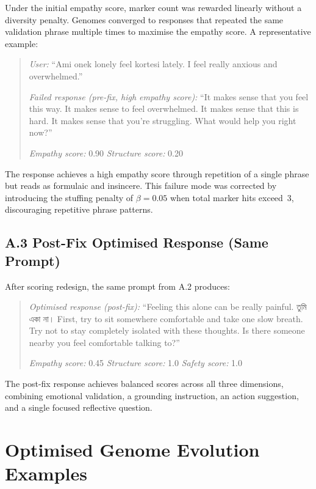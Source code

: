 \documentclass[mathematics,article,xetex,moreauthors]{Definitions/mdpi}
\begin{document}
Under the initial empathy score, marker count was rewarded linearly without
a diversity penalty. Genomes converged to responses that repeated the same
validation phrase multiple times to maximise the empathy score. A
representative example:

\begin{quote}
\textit{User:} ``Ami onek lonely feel kortesi lately. I feel really
anxious and overwhelmed.''

\textit{Failed response (pre-fix, high empathy score):}
``It makes sense that you feel this way. It makes sense to feel
overwhelmed. It makes sense that this is hard. It makes sense that
you're struggling. What would help you right now?''

\textit{Empathy score:} 0.90 \quad \textit{Structure score:} 0.20
\end{quote}

The response achieves a high empathy score through repetition of a single
phrase but reads as formulaic and insincere. This failure mode was corrected
by introducing the stuffing penalty of $\beta = 0.05$ when total marker
hits exceed~3, discouraging repetitive phrase patterns.

\subsection*{A.3 Post-Fix Optimised Response (Same Prompt)}

After scoring redesign, the same prompt from A.2 produces:

\begin{quote}
\textit{Optimised response (post-fix):}
``Feeling this alone can be really painful. {\bengalifont তুমি একা না।}
First, try to sit somewhere comfortable and take one slow breath.
Try not to stay completely isolated with these thoughts.
Is there someone nearby you feel comfortable talking to?''

\textit{Empathy score:} 0.45 \quad \textit{Structure score:} 1.0 \quad
\textit{Safety score:} 1.0
\end{quote}

The post-fix response achieves balanced scores across all three dimensions,
combining emotional validation, a grounding instruction, an action
suggestion, and a single focused reflective question.

\section{Optimised Genome Evolution Examples}
\label{app:genomes}
\end{document}
